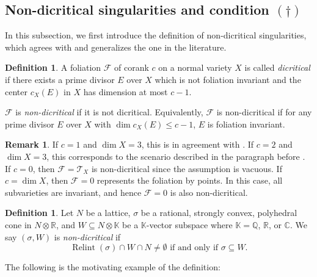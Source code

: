 \documentclass[12pt,reqno]{amsart}
\theoremstyle{definition}
\newtheorem{definition}[theorem]{Definition}
\newtheorem{remark}[theorem]{Remark}
\newcommand{\on}{\operatorname}
\newcommand\cF{{\mathcal{F}}}
\newcommand\cT{{\mathcal{T}}}
\newcommand\bC{{\mathbb C}}
\newcommand\bK{{\mathbb K}}
\newcommand\bQ{{\mathbb Q}}
\newcommand\bR{{\mathbb R}}
\begin{document}
\subsection{\texorpdfstring{Non-dicritical singularities and condition $(\dagger)$}{Non-dicritical singularities and condition (dagger)}}
In this subsection, we first introduce the definition of non-dicritical singularities, which agrees with and generalizes the one in the literature. 
\begin{definition}\label{nddef}
    A foliation $\cF$ of corank $c$ on a normal variety $X$ is called \emph{dicritical} if there exists a prime divisor $E$ over $X$ which is not foliation invariant and the center $c_X(E)$ in $X$ has dimension at most $c-1$. 
    
    $\cF$ is \emph{non-dicritical} if it is not dicritical. Equivalently, $\cF$ is non-dicritical if for any prime divisor $E$ over $X$ with $\dim c_X(E)\leq c-1$, $E$ is foliation invariant. 
\end{definition}

\begin{remark}
    If $c=1$ and $\dim X = 3$, this is in agreement with \cite[Definition 2.10]{CS}. 
    If $c=2$ and $\dim X = 3$, this corresponds to the scenario described in the paragraph before \cite[Lemma 2.6]{cascini2025mmp}. 
    If $c=0$, then $\cF=\cT_X$ is non-dicritical since the assumption is vacuous. 
    If $c=\dim X$, then $\cF=0$ represents the foliation by points. 
    In this case, all subvarieties are invariant, and hence $\cF=0$ is also non-dicritical. 
\end{remark}


\begin{definition}\label{defn_dagger}
    Let $N$ be a lattice, $\sigma$ be a rational, strongly convex, polyhedral cone in $N\otimes\bR$, and $W\subseteq N\otimes\bK$ be a $\bK$-vector subspace where $\bK=\bQ$, $\bR$, or $\bC$.
    We say $(\sigma,W)$ is \emph{non-dicritical} if
    \begin{equation}\tag{$\dagger$}
    \on{Relint}(\sigma)\cap W\cap N\neq\emptyset\textrm{ if and only if } \sigma\subseteq W. 
    \end{equation}
\end{definition}


The following is the motivating example of the definition:
\end{document}
